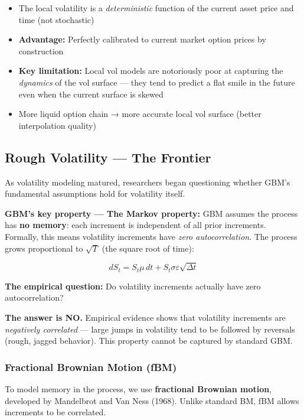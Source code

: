 \documentclass[12pt,openany]{book}
\theoremstyle{definition}
\theoremstyle{remark}
\begin{document}
\begin{itemize}
\begin{itemize}
\item The local volatility is a \emph{deterministic} function of the current asset price and time (not stochastic)


\item \textbf{Advantage:} Perfectly calibrated to current market option prices by construction


\item \textbf{Key limitation:} Local vol models are notoriously poor at capturing the \emph{dynamics} of the vol surface --- they tend to predict a flat smile in the future even when the current surface is skewed


\item More liquid option chain → more accurate local vol surface (better interpolation quality)


\end{itemize}

\end{itemize}
\medskip
\subsection{Rough Volatility --- The Frontier}
As volatility modeling matured, researchers began questioning whether GBM's fundamental assumptions hold for volatility itself.

\textbf{GBM's key property --- The Markov property:} GBM assumes the process has \textbf{no memory}: each increment is independent of all prior increments. Formally, this means volatility increments have \emph{zero autocorrelation}. The process grows proportional to $\sqrt{T}$ (the square root of time):

\[
dS_t = S_t \mu \, dt + S_t \sigma \varepsilon \sqrt{\Delta t}
\]

\textbf{The empirical question:} Do volatility increments actually have zero autocorrelation?

\textbf{The answer is NO.} Empirical evidence shows that volatility increments are \emph{negatively correlated} --- large jumps in volatility tend to be followed by reversals (rough, jagged behavior). This property cannot be captured by standard GBM.

\subsubsection{Fractional Brownian Motion (fBM)}
To model memory in the process, we use \textbf{fractional Brownian motion}, developed by Mandelbrot and Van Ness (1968). Unlike standard BM, fBM allows increments to be correlated.
\end{document}
